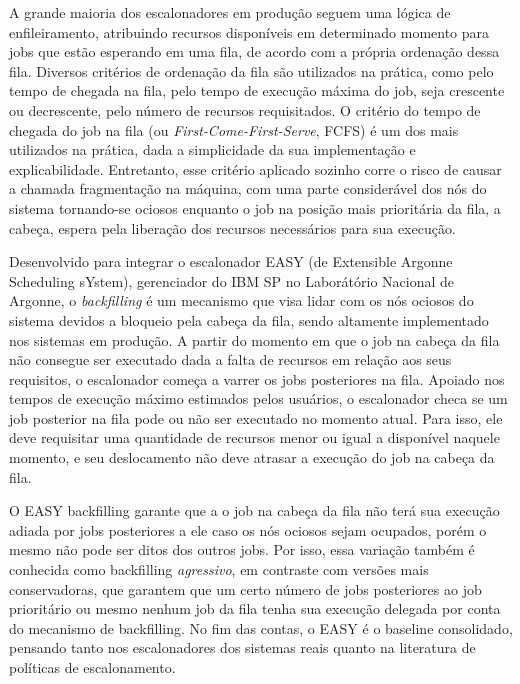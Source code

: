 A grande maioria dos escalonadores em produção seguem uma lógica de enfileiramento, atribuindo recursos
disponíveis em determinado momento para jobs que estão esperando em uma fila, de acordo com a própria 
ordenação dessa fila. Diversos critérios de ordenação da fila são utilizados na prática, como pelo tempo
de chegada na fila, pelo tempo de execução máxima do job, seja crescente ou decrescente, pelo número de
recursos requisitados. O critério do tempo de chegada do job na fila (ou \textit{First-Come-First-Serve}, 
FCFS) é um dos mais utilizados na prática, dada a simplicidade da sua implementação e explicabilidade. 
Entretanto, esse critério aplicado sozinho corre o risco de causar a chamada fragmentação na máquina, 
com uma parte considerável dos nós do sistema tornando-se ociosos enquanto o job na posição mais 
prioritária da fila, a cabeça, espera pela liberação dos recursos necessários para sua execução.

Desenvolvido para integrar o escalonador EASY (de Extensible Argonne Scheduling sYstem), gerenciador 
do IBM SP no Laborátório Nacional de Argonne, o \emph{backfilling} é um mecanismo que visa lidar com os
nós ociosos do sistema devidos a bloqueio pela cabeça da fila, sendo altamente implementado nos 
sistemas em produção. A partir do momento em que o job na cabeça da fila não consegue ser executado
dada a falta de recursos em relação aos seus requisitos, o escalonador começa a varrer os jobs posteriores
na fila. Apoiado nos tempos de execução máximo estimados pelos usuários, o escalonador checa se um 
job posterior na fila pode ou não ser executado no momento atual. Para isso, ele deve requisitar uma
quantidade de recursos menor ou igual a disponível naquele momento, e seu deslocamento não deve atrasar
a execução do job na cabeça da fila. 

O EASY backfilling garante que a o job na cabeça da fila não terá sua execução adiada
por jobs posteriores a ele caso os nós ociosos sejam ocupados, porém o mesmo não pode ser 
ditos dos outros jobs. Por isso, essa variação também é conhecida como backfilling \emph{agressivo},
em contraste com versões mais conservadoras, que garantem que um certo número de jobs posteriores
ao job prioritário ou mesmo nenhum job da fila tenha sua execução delegada por conta do mecanismo
de backfilling. No fim das contas, o EASY é o baseline consolidado, pensando tanto nos
escalonadores dos sistemas reais quanto na literatura de políticas de escalonamento.

